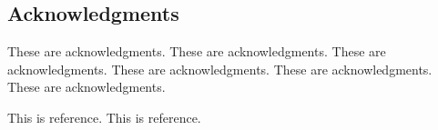 \documentclass[hyperref]{ctexart}
\begin{document}
\begin{multicols}{2}
	\section*{Acknowledgments}
	 These are acknowledgments. These are acknowledgments. These are acknowledgments. These are acknowledgments. These are acknowledgments. These are acknowledgments.
	\begin{thebibliography}{100}%
		This is reference.%
		This is reference.%
	\end{thebibliography}
	\end{multicols}
\end{document}
